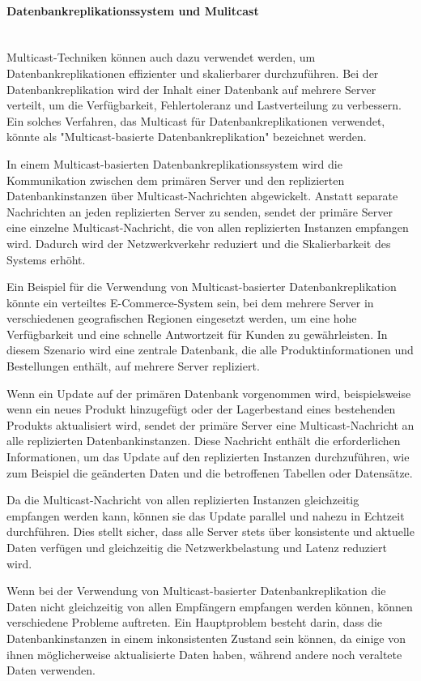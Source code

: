 \documentclass[../vs-script-first-v01.tex]{subfiles}
\begin{document}
\paragraph{Datenbankreplikationssystem und Mulitcast}\mbox{}\\
Multicast-Techniken können auch dazu verwendet werden, um Datenbankreplikationen effizienter und skalierbarer durchzuführen. Bei der Datenbankreplikation wird der Inhalt einer Datenbank auf mehrere Server verteilt, um die Verfügbarkeit, Fehlertoleranz und Lastverteilung zu verbessern. Ein solches Verfahren, das Multicast für Datenbankreplikationen verwendet, könnte als "Multicast-basierte Datenbankreplikation" bezeichnet werden.

In einem Multicast-basierten Datenbankreplikationssystem wird die Kommunikation zwischen dem primären Server und den replizierten Datenbankinstanzen über Multicast-Nachrichten abgewickelt. Anstatt separate Nachrichten an jeden replizierten Server zu senden, sendet der primäre Server eine einzelne Multicast-Nachricht, die von allen replizierten Instanzen empfangen wird. Dadurch wird der Netzwerkverkehr reduziert und die Skalierbarkeit des Systems erhöht.

Ein Beispiel für die Verwendung von Multicast-basierter Datenbankreplikation könnte ein verteiltes E-Commerce-System sein, bei dem mehrere Server in verschiedenen geografischen Regionen eingesetzt werden, um eine hohe Verfügbarkeit und eine schnelle Antwortzeit für Kunden zu gewährleisten. In diesem Szenario wird eine zentrale Datenbank, die alle Produktinformationen und Bestellungen enthält, auf mehrere Server repliziert.

Wenn ein Update auf der primären Datenbank vorgenommen wird, beispielsweise wenn ein neues Produkt hinzugefügt oder der Lagerbestand eines bestehenden Produkts aktualisiert wird, sendet der primäre Server eine Multicast-Nachricht an alle replizierten Datenbankinstanzen. Diese Nachricht enthält die erforderlichen Informationen, um das Update auf den replizierten Instanzen durchzuführen, wie zum Beispiel die geänderten Daten und die betroffenen Tabellen oder Datensätze.

Da die Multicast-Nachricht von allen replizierten Instanzen gleichzeitig empfangen werden kann, können sie das Update parallel und nahezu in Echtzeit durchführen. Dies stellt sicher, dass alle Server stets über konsistente und aktuelle Daten verfügen und gleichzeitig die Netzwerkbelastung und Latenz reduziert wird.

Wenn bei der Verwendung von Multicast-basierter Datenbankreplikation die Daten nicht gleichzeitig von allen Empfängern empfangen werden können, können verschiedene Probleme auftreten. Ein Hauptproblem besteht darin, dass die Datenbankinstanzen in einem inkonsistenten Zustand sein können, da einige von ihnen möglicherweise aktualisierte Daten haben, während andere noch veraltete Daten verwenden.
\end{document}
